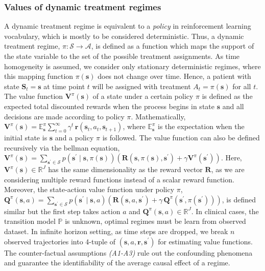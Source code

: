\documentclass{article}
\newcommand{\bs}{ \boldsymbol}
\newcommand{\mb}{\mathbb}
\newcommand{\ml}{\mathcal}
\newcommand{\lt}{\left}
\newcommand{\rt}{\right}
\begin{document}
\subsubsection*{Values of dynamic treatment regimes}
A dynamic treatment regime is equivalent to a \textit{policy} in reinforcement learning vocabulary, which is mostly to be considered deterministic. Thus, a dynamic treatment regime, $\pi : \bs{\ml{S}} \to \mathcal{A}$, is defined as a function which maps the support of the state variable to the set of the possible treatment assignments. As time homogeneity is assumed, we consider only stationary deterministic regimes, where this mapping function $\pi(\bs{s})$ does not change over time. Hence, a patient with state $\bs{S}_t = \bs{s}$ at time point $t$ will be assigned with treatment $A_t = \pi\lt(\bs{s}\rt)$ for all $t$.  
The value function $\bs{V}^{\pi}\lt(\bs{s}\rt)$ of a state under a certain policy $\pi$ is defined as the expected total discounted rewards when the process begins in state $\bs{s}$ and all decisions are made according to policy $\pi$. Mathematically, $\bs{V}^{\pi}\lt(\bs{s}\rt) = \mb{E}_{\bs{s}}^{\pi} \sum_{t=0}^{\infty} \gamma^{t} \, \bs{r}(\bs{s}_t, a_t, \bs{s}_{t+1})$, where $\mb{E}_{\bs{s}}^{\pi}$ is the expectation when the initial state is $\bs{s}$ and a policy $\pi$ is followed. The value function can also be defined recursively via the bellman equation, $\bs{V}^{\pi}\lt(\bs{s}\rt) = \sum_{\bs{s}^{\prime}\in\bs{\ml{S}}}  p(\bs{s}^{\prime} \mid \bs{s}, \pi(\bs{s})) \lt(\bs{R}(\bs{s}, \pi(\bs{s}), \bs{s}^{\prime}) + \gamma \bs{V}^{\pi}(\bs{s}^{\prime})\rt)$. Here, $\bs{V}^{\pi}(\bs{s}) \in \mb{R}^J$ has the same dimensionality as the reward vector $\bs{R}$, as we are considering multiple reward functions instead of a scalar reward function.  Moreover, the state-action value function under policy $\pi$, $\bs{Q}^{\pi}(\bs{s}, a) =\sum_{\bs{s}^{\prime} \in \bs{\ml{S}}}  p\lt(\bs{s}^{\prime} \mid \bs{s}, a\rt) \lt( \bs{R}\lt(\bs{s}, a, \bs{s}^{\prime}\rt) + \gamma \, \bs{Q}^{\pi}(\bs{s}^{\prime}, \pi(\bs{s}^{\prime}) ) \rt)$,
is defined similar but the first step takes action $a$ and $\bs{Q}^{\pi}(\bs{s}, a) \in \mb{R}^J$. In clinical cases, the transition model $\mb{P}$ is unknown, optimal regimes must be learn from observed dataset. In infinite horizon setting, as time steps are dropped, we break $n$ observed trajectories into 4-tuple of $(\bs{s}, a, \bs{r}, \bs{s}^{\prime})$ for estimating value functions. The counter-factual assumptions \textit{(A1-A3)} rule out the confounding phenomena and guarantee the identifiability of the average causal effect of a regime.
\end{document}
